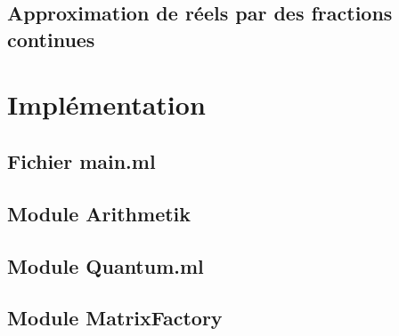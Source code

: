 \documentclass[a4paper,10pt]{article}
\begin{document}
\subsection{Approximation de réels par des fractions continues}





\appendix
\section{Implémentation}
\subsection{Fichier main.ml}
\subsection{Module Arithmetik}
\subsection{Module Quantum.ml}
\subsection{Module MatrixFactory}
\end{document}
